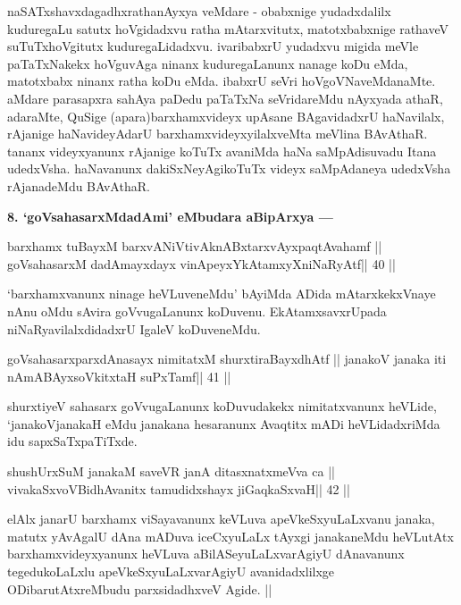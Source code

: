 \begin{artha}
naSATxshavxdagadhxrathanAyxya veMdare - obabxnige yudadxdalilx kuduregaLu satutx hoVgidadxvu ratha mAtarxvitutx, matotxbabxnige rathaveV suTuTxhoVgitutx kuduregaLidadxvu. ivaribabxrU yudadxvu migida meVle paTaTxNakekx hoVguvAga ninanx kuduregaLanunx nanage koDu eMda, matotxbabx ninanx ratha koDu eMda. ibabxrU seVri hoVgoVNaveMdanaMte. aMdare parasapxra sahAya paDedu paTaTxNa seVridareMdu nAyxyada athaR, adaraMte, QuSige (apara)barxhamxvideyx upAsane BAgavidadxrU haNavilalx, rAjanige haNavideyAdarU barxhamxvideyxyilalxveMta meVlina BAvAthaR. tananx videyxyanunx rAjanige koTuTx avaniMda haNa saMpAdisuvadu Itana udedxVsha. haNavanunx dakiSxNeyAgikoTuTx videyx saMpAdaneya udedxVsha rAjanadeMdu BAvAthaR.
\end{artha}

\begin{artha}
{\bf 8. `goVsahasarxMdadAmi' eMbudara aBipArxya ---}
\end{artha} 

\begin{shl}
barxhamx tuBayxM barxvANiVtivAknABxtarxvAyxpaqtAvahamf ||
goVsahasarxM dadAmayxdayx vinA\s peyxYkAtamxyXniNaRyAtf\hfill || 40 ||
\end{shl}

\begin{artha}
`barxhamxvanunx ninage heVLuveneMdu' bAyiMda ADida mAtarxkekxVnaye nAnu oMdu sAvira goVvugaLanunx koDuvenu. EkAtamxsavxrUpada niNaRyavilalxdidadxrU IgaleV koDuveneMdu.
\end{artha}

\begin{shl}
goVsahasarxparxdAnasayx nimitatxM shurxtiraBayxdhAtf ||
janakoV janaka iti nAmABAyxsoVkitxtaH suPxTamf\hfill || 41 ||
\end{shl}

\begin{artha}
shurxtiyeV sahasarx goVvugaLanunx koDuvudakekx nimitatxvanunx heVLide, `janakoVjanakaH eMdu janakana hesaranunx Avaqtitx mADi heVLidadxriMda idu sapxSaTxpaTiTxde.
\end{artha}

\begin{shl}
shushUrxSuM janakaM saveVR janA ditasxnatxmeVva ca ||
vivakaSxvoV\s BidhAvanitx tamudidxshayx jiGaqkaSxvaH\hfill || 42 ||
\end{shl}

\begin{artha}
elAlx janarU barxhamx viSayavanunx keVLuva apeVkeSxyuLaLxvanu janaka, matutx yAvAgalU dAna mADuva iceCxyuLaLx tAyxgi janakaneMdu heVLutAtx barxhamxvideyxyanunx heVLuva aBilASeyuLaLxvarAgiyU dAnavanunx tegedukoLaLxlu apeVkeSxyuLaLxvarAgiyU avanidadxlilxge ODibarutAtxreMbudu parxsidadhxveV Agide. ||
\end{artha}

